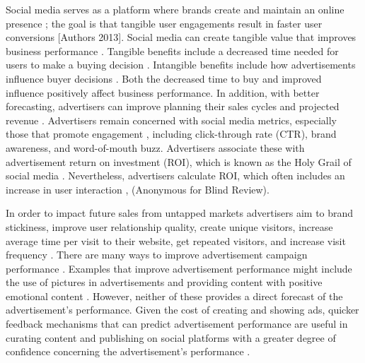 \documentclass[mksc,blindrev]{informs3} %
\begin{document}
Social media serves as a platform where brands create and maintain an online presence \cite{Greenwood2016}; the goal is that tangible user engagements result in faster user conversions [Authors 2013]. Social media can create tangible value that improves business performance \cite{Barreto2013}. Tangible benefits include a decreased time needed for users to make a buying decision \cite{Barreto2013}. Intangible benefits include how advertisements influence buyer decisions \cite{Barreto2013}. Both the decreased time to buy and improved influence positively affect business performance. In addition, with better forecasting, advertisers can improve planning their sales cycles and projected revenue \cite{Imsa2020}. Advertisers remain concerned with social media metrics, especially those that promote engagement \cite{Tiago2014}, including click-through rate (CTR), brand awareness, and word-of-mouth buzz. Advertisers associate these with advertisement return on investment (ROI), which is known as the Holy Grail of social media \cite{Fisher2009}. Nevertheless, advertisers calculate ROI, which often includes an increase in user interaction \cite{Romero2011}, (Anonymous for Blind Review). 

In order to impact future sales from untapped markets \cite{Guo2020} advertisers aim to brand stickiness, improve user relationship quality, create unique visitors, increase average time per visit to their website, get repeated visitors, and increase visit frequency \cite{Bhat2002}. There are many ways to improve advertisement campaign performance \cite{Imsa2020}. Examples that improve advertisement performance might include the use of pictures in advertisements \cite{Wagner2015AntecedentsOB} and providing content with positive emotional content \cite{Chen2018}. However, neither of these provides a direct forecast of the advertisement’s performance. Given the cost of creating and showing ads, quicker feedback mechanisms that can predict advertisement performance are useful in curating content and publishing on social platforms with a greater degree of confidence concerning the advertisement’s performance \cite{Hu2016}.
\end{document}
